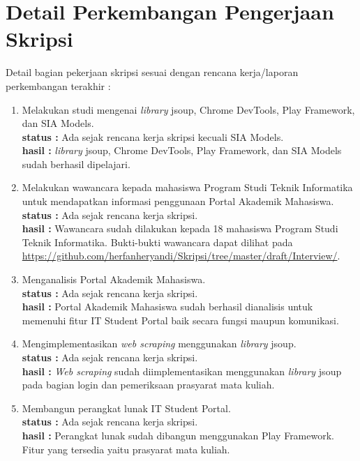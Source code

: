 \documentclass[a4paper,twoside]{article}
\begin{document}
\section{Detail Perkembangan Pengerjaan Skripsi}
Detail bagian pekerjaan skripsi sesuai dengan rencana kerja/laporan perkembangan terakhir :
	\begin{enumerate}
		\item Melakukan studi mengenai \textit{library} jsoup, Chrome DevTools, Play Framework, dan SIA Models.\\
		{\bf status :} Ada sejak rencana kerja skripsi kecuali SIA Models.\\
		{\bf hasil :} \textit{library} jsoup, Chrome DevTools, Play Framework, dan SIA Models sudah berhasil dipelajari.
		
		\item Melakukan wawancara kepada mahasiswa Program Studi Teknik Informatika untuk mendapatkan informasi
penggunaan Portal Akademik Mahasiswa.\\
		{\bf status :} Ada sejak rencana kerja skripsi.\\
		{\bf hasil :} Wawancara sudah dilakukan kepada 18 mahasiswa Program Studi Teknik Informatika. Bukti-bukti wawancara dapat dilihat pada \url{https://github.com/herfanheryandi/Skripsi/tree/master/draft/Interview/}.

		\item Menganalisis Portal Akademik Mahasiswa.\\
		{\bf status :} Ada sejak rencana kerja skripsi.\\
		{\bf hasil :} Portal Akademik Mahasiswa sudah berhasil dianalisis untuk memenuhi fitur IT Student Portal baik secara fungsi maupun komunikasi.

		\item Mengimplementasikan \textit{web scraping} menggunakan \textit{library} jsoup.\\
		{\bf status :} Ada sejak rencana kerja skripsi.\\
		{\bf hasil :} \textit{Web scraping} sudah diimplementasikan menggunakan \textit{library} jsoup pada bagian login dan pemeriksaan prasyarat mata kuliah.

		\item Membangun perangkat lunak IT Student Portal.\\
		{\bf status :} Ada sejak rencana kerja skripsi.\\
		{\bf hasil :} Perangkat lunak sudah dibangun menggunakan Play Framework. Fitur yang tersedia yaitu prasyarat mata kuliah.


\end{enumerate}
\end{document}
